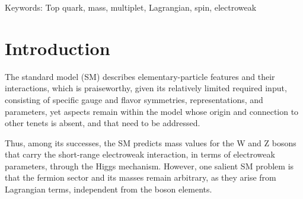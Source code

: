 \documentclass[12pt]{article}
\renewcommand\[{\begin{dmath}}
\renewcommand\]{\end{dmath}}
\begin{document}




\vskip 1cm
Keywords: Top quark, mass, multiplet,   Lagrangian, spin, electroweak

 \baselineskip 22pt\vfil\eject \noindent

\section{Introduction}





The standard model (SM)  describes elementary-particle features and  their interactions, which is praiseworthy, given its relatively limited required  input,
 consisting of specific gauge and flavor symmetries, representations,  and parameters, yet
aspects remain within the model whose origin and connection to other tenets is absent, and that need to be addressed.




 Thus, among its successes,   the SM   predicts  mass  values for the W and Z  bosons\cite{Glashow} that  carry  the short-range electroweak interaction, in terms of electroweak parameters,  through the    Higgs mechanism\cite{HiggsMech,HiggsMechHiggs}.
 However, one salient SM problem  is that the    fermion sector and its  masses  remain  arbitrary, as they arise  from  Lagrangian terms, independent from the boson  elements.
\end{document}
